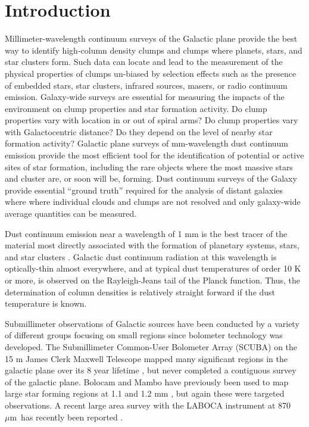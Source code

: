 \documentclass[12pt,preprint]{aastex}
\newcommand{\mum}{\ensuremath{\mu \mathrm{m}}}
\begin{document}

%

\section{Introduction}
\label{sec:Introduction}

Millimeter-wavelength continuum surveys of the Galactic plane provide
the best way to identify high-column density clumps and clumps where
planets, stars, and star clusters form.  Such data can locate and lead
to the measurement of the physical properties of clumps un-biased by
selection effects such as the presence of embedded stars, star
clusters, infrared sources, masers, or radio continuum emission.
Galaxy-wide surveys are essential for measuring the impacts of the
environment on clump properties and star formation activity.  Do clump
properties vary with location in or out of spiral arms?  Do clump
properties vary with Galactocentric distance?  Do they depend on the
level of nearby star formation activity?  Galactic plane surveys of
mm-wavelength dust continuum emission provide the most efficient tool
for the identification of potential or active sites of star formation,
including the rare objects where the most massive stars and cluster
are, or soon will be, forming.  Dust continuum surveys of the Galaxy
provide essential ``ground truth'' required for the analysis of distant
galaxies where where individual clouds and clumps are not resolved and
only galaxy-wide average quantities can be measured.

Dust continuum emission near a wavelength of 1 mm is the best tracer
of the material most directly associated with the formation of
planetary systems, stars, and star clusters \citep{johnstone06}.
Galactic dust continuum radiation at this wavelength is optically-thin
almost everywhere, and at typical dust temperatures of order 10 K or
more, is observed on the Rayleigh-Jeans tail of the Planck function.
Thus, the determination of column densities is relatively straight
forward if the dust temperature is known.

Submillimeter observations of Galactic sources have been conducted by
a variety of different groups focusing on small regions since
bolometer technology was developed.  The Submillimeter Common-User
Bolometer Array (SCUBA) on the 15 m James Clerk Maxwell Telescope
mapped many significant regions in the galactic plane over its 8 year
lifetime \citep{holland99,difrancesco08}, but never completed a
contiguous survey of the galactic plane.  Bolocam and Mambo have
previously been used to map large star forming regions at 1.1
\citep{enoch06} and 1.2 mm \citep{motte07}, but again these were
targeted observations.  A recent large area survey with the LABOCA
instrument at 870 \mum\ has recently been reported \citep{schuller09}.
\end{document}
